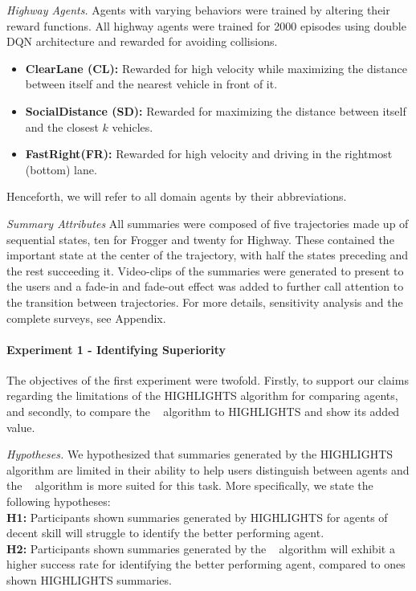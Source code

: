 \emph{Highway Agents.}  Agents with varying behaviors were trained by altering their reward functions. All highway agents were trained for 2000 episodes using double DQN architecture
\cite{hasselt2010double} and rewarded for avoiding collisions.
\begin{itemize}
	\item \textbf{ClearLane (CL):} Rewarded for high velocity while maximizing the distance between
	itself and the nearest vehicle in front of it.
	\item \textbf{SocialDistance (SD):} Rewarded for maximizing the distance
	between itself and the closest $k$ vehicles.
	\item \textbf{FastRight(FR):} Rewarded for high velocity and driving in the
	rightmost (bottom) lane.
\end{itemize}
Henceforth,
we will refer to all domain agents by their abbreviations.

\emph{Summary Attributes}
All summaries were composed of five trajectories made up of sequential states, ten for Frogger and twenty for Highway. These contained the important state at the center of the
trajectory, with half the states preceding and the rest succeeding it.
Video-clips of the summaries were generated to present to the users and a
fade-in and fade-out effect was added to further call attention to the
transition between trajectories.
 For more details, sensitivity analysis and the complete surveys, see Appendix.


\paragraph{Experiment 1 - Identifying Superiority}
The objectives of the first experiment were twofold. Firstly, to support our
claims regarding the limitations of the HIGHLIGHTS algorithm for comparing
agents, and secondly, to compare the \disalg~ algorithm to HIGHLIGHTS and show
its added value. 

\emph{Hypotheses.} 
We hypothesized that summaries generated by the HIGHLIGHTS
algorithm are limited in their ability to help users distinguish between agents
and the \disalg~ algorithm is more suited for this task. More specifically,
we state the following hypotheses: \\
 \textbf{H1:} Participants shown summaries generated by HIGHLIGHTS for
 agents of decent skill will struggle to identify the better performing
 agent. \\
\textbf{H2:} Participants shown summaries generated by the \disalg~
algorithm will exhibit a higher success rate for identifying the better
performing agent, compared to ones shown HIGHLIGHTS summaries. 

